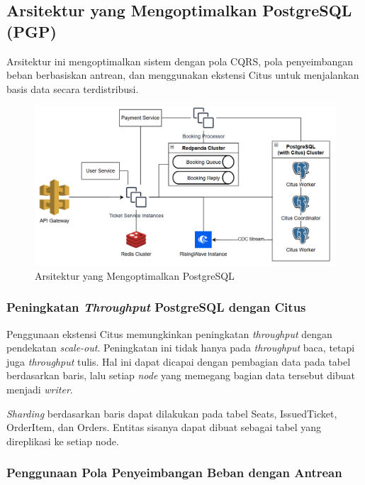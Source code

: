 \subsection{Arsitektur yang Mengoptimalkan PostgreSQL (PGP)}

Arsitektur ini mengoptimalkan sistem dengan pola CQRS, pola penyeimbangan beban berbasiskan antrean, dan menggunakan ekstensi Citus untuk menjalankan basis data secara terdistribusi.

\begin{figure}[htbp]
    \centering
    \includegraphics[width=1\textwidth]{resources/appendix/architecture-optimized.png}
    \caption{Arsitektur yang Mengoptimalkan PostgreSQL}
    \label{fig:optimized-architecture}
\end{figure}

\subsubsection{Peningkatan \textit{Throughput} PostgreSQL dengan Citus}

Penggunaan ekstensi Citus memungkinkan peningkatan \textit{throughput} dengan pendekatan \textit{scale-out}. Peningkatan ini tidak hanya pada \textit{throughput} baca, tetapi juga \textit{throughput} tulis. Hal ini dapat dicapai dengan pembagian data pada tabel berdasarkan baris, lalu setiap \textit{node} yang memegang bagian data tersebut dibuat menjadi \textit{writer}.

\textit{Sharding} berdasarkan baris dapat dilakukan pada tabel Seats, IssuedTicket, OrderItem, dan Orders. Entitas sisanya dapat dibuat sebagai tabel yang direplikasi ke setiap node.

\subsubsection{Penggunaan Pola Penyeimbangan Beban dengan Antrean}

